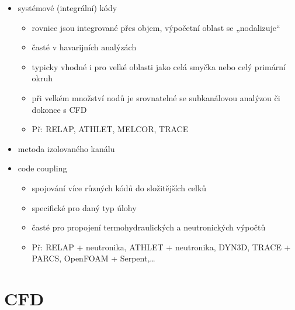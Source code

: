 \documentclass[letterpaper,10pt,czech]{sphinxmanual}
\begin{document}
\begin{itemize}
\begin{itemize}
\end{itemize}

\item {} 
\sphinxAtStartPar
systémové (integrální) kódy
\begin{itemize}
\item {} 
\sphinxAtStartPar
rovnice jsou integrované přes objem, výpočetní oblast se „nodalizuje“

\item {} 
\sphinxAtStartPar
časté v havarijních analýzách

\item {} 
\sphinxAtStartPar
typicky vhodné i pro velké oblasti jako celá smyčka nebo celý primární okruh

\item {} 
\sphinxAtStartPar
při velkém množství nodů je srovnatelné se subkanálovou analýzou či dokonce s CFD

\item {} 
\sphinxAtStartPar
Př: RELAP, ATHLET, MELCOR, TRACE

\end{itemize}

\item {} 
\sphinxAtStartPar
metoda izolovaného kanálu

\item {} 
\sphinxAtStartPar
code coupling
\begin{itemize}
\item {} 
\sphinxAtStartPar
spojování více různých kódů do složitějších celků

\item {} 
\sphinxAtStartPar
specifické pro daný typ úlohy

\item {} 
\sphinxAtStartPar
časté pro propojení termohydraulických a neutronických výpočtů

\item {} 
\sphinxAtStartPar
Př: RELAP + neutronika, ATHLET + neutronika, DYN3D, TRACE + PARCS, OpenFOAM + Serpent,…

\end{itemize}

\end{itemize}

\sphinxstepscope


\chapter{CFD}
\label{\detokenize{prednaska_23092022:cfd}}\label{\detokenize{prednaska_23092022::doc}}
\end{document}
